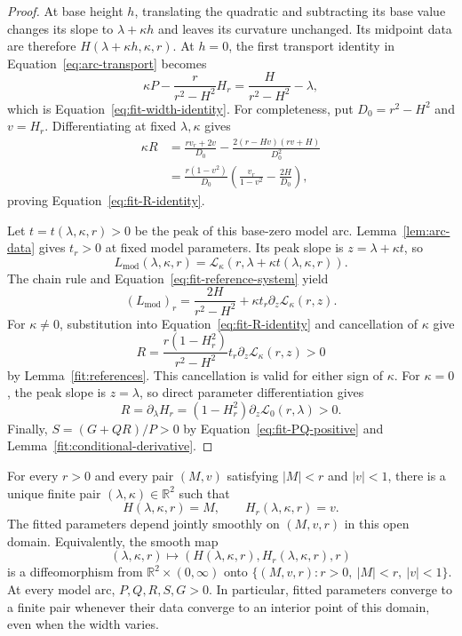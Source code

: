\begin{proof}
At base height \(h\), translating the quadratic and subtracting its
base value changes its slope to \(\lambda+\kappa h\) and leaves its
curvature unchanged.  Its midpoint data are therefore
\(H(\lambda+\kappa h,\kappa,r)\).  At \(h=0\), the first transport
identity in Equation~\eqref{eq:arc-transport} becomes
\[
 \kappa P-\frac r{r^2-H^2}H_r
     =\frac H{r^2-H^2}-\lambda,
\]
which is Equation~\eqref{eq:fit-width-identity}.
For completeness, put \(D_0=r^2-H^2\) and \(v=H_r\).
Differentiating at fixed \(\lambda,\kappa\) gives
\begin{align*}
 \kappa R
 &=\frac{rv_r+2v}{D_0}
      -\frac{2(r-Hv)(rv+H)}{D_0^2}\\
 &=\frac{r(1-v^2)}{D_0}
      \left(\frac{v_r}{1-v^2}-\frac{2H}{D_0}\right),
\end{align*}
proving Equation~\eqref{eq:fit-R-identity}.

Let \(t=t(\lambda,\kappa,r)>0\) be the peak of this base-zero model
arc.  Lemma~\ref{lem:arc-data} gives \(t_r>0\) at fixed model
parameters.  Its peak slope is \(z=\lambda+\kappa t\), so
\[
 L_{\mathrm{mod}}(\lambda,\kappa,r)
       =\mathcal L_\kappa(r,\lambda+\kappa t(\lambda,\kappa,r)).
\]
The chain rule and Equation~\eqref{eq:fit-reference-system} yield
\begin{equation}\label{eq:fit-base-width-L}
 (L_{\mathrm{mod}})_r
    =\frac{2H}{r^2-H^2}
       +\kappa t_r\partial_z\mathcal L_\kappa(r,z).
\end{equation}
For \(\kappa\ne0\), substitution into
Equation~\eqref{eq:fit-R-identity} and cancellation of \(\kappa\) give
\[
 R=\frac{r(1-H_r^2)}{r^2-H^2}
       t_r\partial_z\mathcal L_\kappa(r,z)>0
\]
by Lemma~\ref{fit:references}.  This cancellation is valid for
either sign of \(\kappa\).  For \(\kappa=0\), the peak slope is
\(z=\lambda\), so direct parameter differentiation gives
\[
 R=\partial_\lambda H_r
      =(1-H_r^2)\partial_z\mathcal L_0(r,\lambda)>0.
\]
Finally, \(S=(G+QR)/P>0\) by
Equation~\eqref{eq:fit-PQ-positive} and
Lemma~\ref{fit:conditional-derivative}.
\end{proof}

\begin{theorem}\label{thm:quadratic-fit}
For every \(r>0\) and every pair \((M,v)\) satisfying
\(|M|<r\) and \(|v|<1\), there is a unique finite pair
\((\lambda,\kappa)\in\mathbb R^2\) such that
\[
 H(\lambda,\kappa,r)=M,\qquad H_r(\lambda,\kappa,r)=v.
\]
The fitted parameters depend jointly smoothly on \((M,v,r)\) in
this open domain.  Equivalently, the smooth map
\begin{equation}\label{eq:fit-joint-map}
 (\lambda,\kappa,r)\longmapsto
       (H(\lambda,\kappa,r),H_r(\lambda,\kappa,r),r)
\end{equation}
is a diffeomorphism from \(\mathbb R^2\times(0,\infty)\) onto
\(\{(M,v,r):r>0,\ |M|<r,\ |v|<1\}\).
At every model arc, \(P,Q,R,S,G>0\).
In particular, fitted parameters converge to a finite pair whenever
their data converge to an interior point of this domain, even when
the width varies.
\end{theorem}

